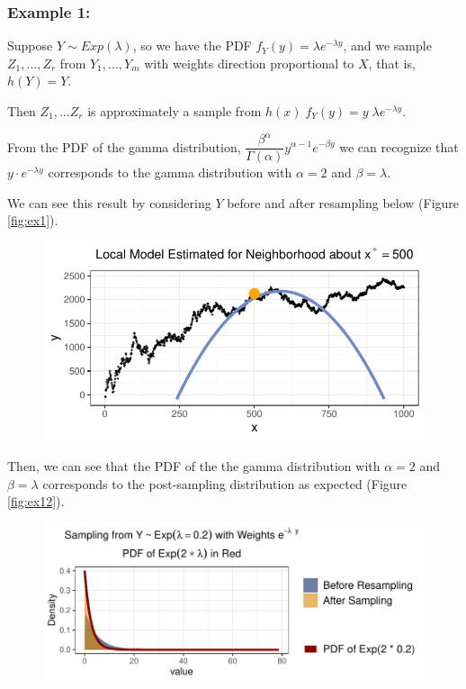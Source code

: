 \documentclass[12pt,twoside]{smiththesis}
\begin{document}
\newpage

\hypertarget{example-1}{%
\subsubsection{Example 1:}\label{example-1}}

Suppose \(Y \sim Exp(\lambda)\), so we have the PDF \(f_Y(y) = \lambda e^{-\lambda y}\), and we sample \(Z_1,\dots,Z_r\) from \(Y_1, \dots, Y_m\) with weights direction proportional to \(X\), that is, \(h(Y) = Y\).

Then \(Z_1,\dots Z_r\) is approximately a sample from \(h(x) \; f_Y(y) = y \; \lambda e^{-\lambda y}\).

From the PDF of the gamma distribution, \(\dfrac{\beta^\alpha}{\Gamma(\alpha) }y^{\alpha - 1} e^{-\beta y}\) we can recognize that \(y \cdot e^{-\lambda y}\) corresponds to the gamma distribution with \(\alpha = 2\) and \(\beta = \lambda\).

We can see this result by considering \(Y\) before and after resampling below (Figure \ref{fig:ex1}).
\begin{figure}

{\centering \includegraphics{thesis_files/figure-latex/unnamed-chunk-21-1} 

}

\caption{\label{fig:ex1}}\label{fig:unnamed-chunk-21}
\end{figure}
Then, we can see that the PDF of the the gamma distribution with \(\alpha = 2\) and \(\beta = \lambda\) corresponds to the post-sampling distribution as expected (Figure \ref{fig:ex12}).
\begin{figure}

{\centering \includegraphics{thesis_files/figure-latex/unnamed-chunk-22-1} 

}

\caption{\label{fig:ex12}}\label{fig:unnamed-chunk-22}
\end{figure}
\newpage
\end{document}
